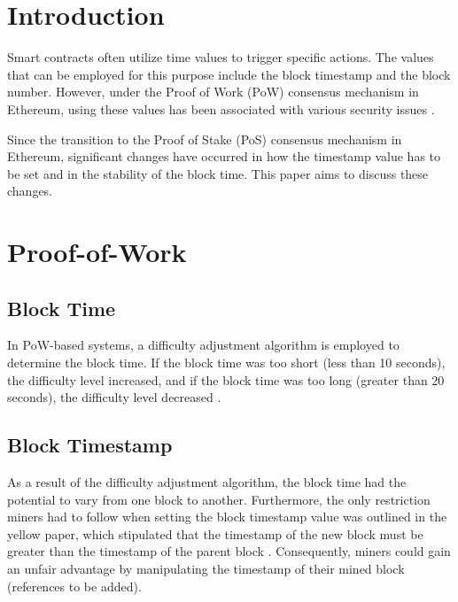 \section{Introduction}

Smart contracts often utilize time values to trigger specific actions. The
values that can be employed for this purpose include the block timestamp and
the block number. However, under the Proof of Work (PoW) consensus mechanism in
Ethereum, using these values has been associated with various security issues
\cite{swc116} \cite{Conkas2021} \cite{DASP2018} \cite{Osiris2018}
\cite{Oyente2016}.


Since the transition to the Proof of Stake (PoS) consensus mechanism in
Ethereum, significant changes have occurred in how the timestamp value has to
be set and in the stability of the block time. This paper aims to discuss these
changes.


\section{Proof-of-Work}

\subsection{Block Time}

In PoW-based systems, a difficulty adjustment algorithm is employed to
determine the block time. If the block time was too short (less than 10
seconds), the difficulty level increased, and if the block time was too long
(greater than 20 seconds), the difficulty level decreased \cite{eip-2}.

\subsection{Block Timestamp}

As a result of the difficulty adjustment algorithm, the block time had the
potential to vary from one block to another. Furthermore, the only restriction
miners had to follow when setting the block timestamp value was outlined in the
yellow paper, which stipulated that the timestamp of the new block must be
greater than the timestamp of the parent block \cite{ethyellowpaper2023}.
Consequently, miners could gain an unfair advantage by manipulating the
timestamp of their mined block (references to be added).

